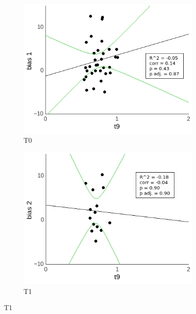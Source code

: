 \documentclass[a4paper]{scrreprt}
\begin{document}
\begin{figure}
\centering
\begin{subfigure}[b]{0.49\textwidth}
        \includegraphics[width=\textwidth]{figs/sec3/t9/t9no_diff_1_mod2dat.jpeg}
        \caption{T0}
    \end{subfigure}
    \begin{subfigure}[b]{0.49\textwidth}
        \includegraphics[width=\textwidth]{figs/sec3/t9/t9no_diff_2_mod2dat.jpeg}
        \caption{T1}
    \end{subfigure}


\end{figure}
\end{document}
